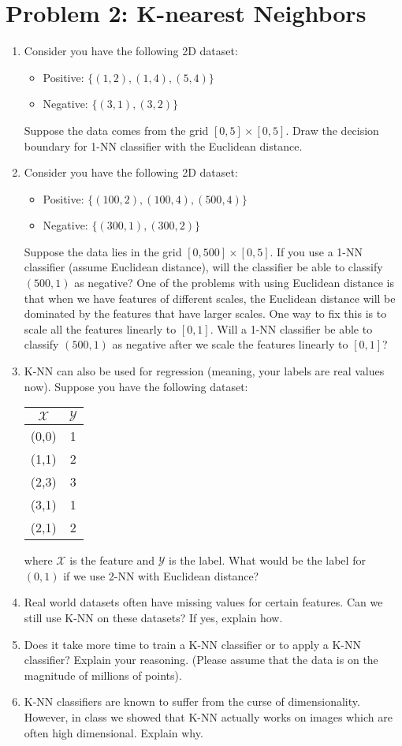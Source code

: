\documentclass[11pt]{article}
\begin{document}
	\section*{Problem 2: K-nearest Neighbors}
	\begin{enumerate}
		\item Consider you have the following 2D dataset:
			\begin{itemize}
				\item Positive: $\{(1, 2), (1, 4), (5,4)\}$
				\item Negative: $\{(3, 1), (3, 2)\}$
			\end{itemize}
			Suppose the data comes from the grid $[0, 5] \times [0, 5]$. Draw the decision boundary for 1-NN classifier with the Euclidean distance. 
		\item Consider you have the following 2D dataset:
			\begin{itemize}
				\item Positive: $\{(100, 2), (100, 4), (500,4)\}$
				\item Negative: $\{(300, 1), (300, 2)\}$
			\end{itemize}
		Suppose the data lies in the grid $[0, 500] \times [0, 5]$. If you use a 1-NN classifier (assume Euclidean distance), will the classifier be able to classify $(500, 1)$ as negative? One of the problems with using Euclidean distance is that when we have features of different scales, the Euclidean distance will be dominated by the features that have larger scales. One way to fix this is to scale all the features linearly to $[0,1]$. Will a 1-NN classifier be able to classify $(500, 1)$ as negative after we scale the features linearly to $[0,1]$?
		\item K-NN can also be used for regression (meaning, your labels are real values now). Suppose you have the following dataset: 
		\begin{center}
			\begin{tabular}{|c|c|}
				\hline
				$\mathcal{X}$ & $\mathcal{Y}$ \\
				\hline
				 (0,0) & 1 \\
				 (1,1) & 2 \\
				 (2,3) & 3 \\
				 (3,1) & 1 \\
				 (2,1) & 2 \\
				 \hline
			\end{tabular}
		\end{center}
		where $\mathcal{X}$ is the feature and $\mathcal{Y}$ is the label. What would be the label for $(0,1)$ if we use 2-NN with Euclidean distance?
		\item Real world datasets often have missing values for certain features. Can we still use K-NN on these datasets? If yes, explain how.   
		\item Does it take more time to train a K-NN classifier or to apply a K-NN classifier? Explain your reasoning. (Please assume that the data is on the magnitude of millions of points).
		\item K-NN classifiers are known to suffer from the curse of dimensionality. However, in class we showed that K-NN actually works on images which are often high dimensional. Explain why.
		

\end{enumerate}
\end{document}
